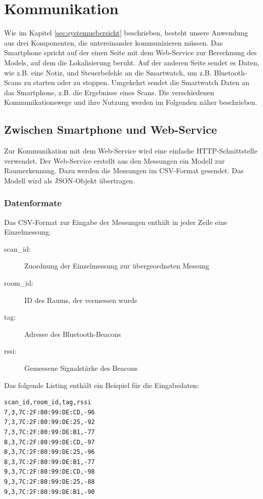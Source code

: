 \section{Kommunikation}
Wie im Kapitel \ref{sec:systemuebersicht} beschrieben, besteht unsere Anwendung aus drei Komponenten, die untereinander kommunizieren müssen. Das Smartphone spricht auf der einen Seite mit dem Web-Service zur Berechnung des Models, auf dem die Lokalisierung beruht. Auf der anderen Seite sendet es Daten, wie z.B. eine Notiz, und Steuerbefehle an die Smartwatch, um z.B. Bluetooth-Scans zu starten oder zu stoppen. Umgekehrt sendet die Smartwatch Daten an das Smartphone, z.B. die Ergebnisse eines Scans. Die verschiedenen Kommunikationswege und ihre Nutzung werden im Folgenden näher beschrieben.

\subsection{Zwischen Smartphone und Web-Service}

Zur Kommunikation mit dem Web-Service wird eine einfache HTTP-Schnittstelle verwendet.
Der Web-Service erstellt aus den Messungen ein Modell zur Raumerkennung. Dazu
werden die Messungen im CSV-Format gesendet. Das Modell wird als JSON-Objekt
übertragen.

\subsubsection{Datenformate}

Das CSV-Format zur Eingabe der Messungen enthält in jeder Zeile eine Einzelmessung.
\begin{description}
	\item[scan\_id:] Zuordnung der Einzelmessung zur übergeordneten Messung
	\item[room\_id:] ID des Raums, der vermessen wurde
	\item[tag:] Adresse des Bluetooth-Beacons
	\item[rssi:] Gemessene Signalstärke des Beacons
\end{description}

Das folgende Listing enthält ein Beispiel für die Eingabedaten:
\begin{lstlisting}
scan_id,room_id,tag,rssi
7,3,7C:2F:80:99:DE:CD,-96
7,3,7C:2F:80:99:DE:25,-92
7,3,7C:2F:80:99:DE:B1,-77
8,3,7C:2F:80:99:DE:CD,-97
8,3,7C:2F:80:99:DE:25,-96
8,3,7C:2F:80:99:DE:B1,-77
9,3,7C:2F:80:99:DE:CD,-98
9,3,7C:2F:80:99:DE:25,-88
9,3,7C:2F:80:99:DE:B1,-90
\end{lstlisting}

